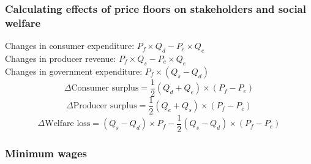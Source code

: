 \subsubsection*{Calculating effects of price floors on stakeholders and social welfare}
Changes in consumer expenditure: $P_f\times Q_d-P_e\times Q_e$\\
Changes in producer revenue: $P_f\times Q_s-P_e\times Q_e$\\
Changes in government expenditure: $P_f\times (Q_s-Q_d)$
\[\Delta \text{Consumer surplus}=\dfrac{1}{2}(Q_d+Q_e)\times (P_f-P_e)\]
\[\Delta \text{Producer surplus}=\dfrac{1}{2}(Q_e+Q_s)\times (P_f-P_e)\]
\[\Delta \text{Welfare loss}=(Q_s-Q_d)\times P_f-\dfrac{1}{2}(Q_s-Q_d)\times (P_f-P_e)\]
\subsubsection*{Minimum wages}


